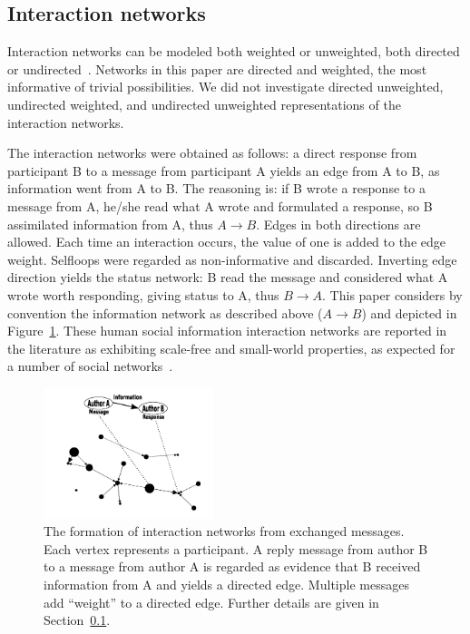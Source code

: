 \documentclass[%
	aip,
	jmp,%
	amsmath,amssymb,
	reprint,%
]{revtex4-1}
\begin{document}
\subsection{Interaction networks}\label{intNet}
Interaction networks can be modeled both weighted or unweighted,
both directed or undirected~\cite{bird,newmanCommunityDirected,newmanCommunity2013}.
Networks in this paper are directed and weighted, the most informative of trivial possibilities.
We did not investigate directed unweighted, undirected weighted,
and undirected unweighted representations of the interaction networks. 

The interaction networks were obtained as follows:
a direct response from participant B to a message from participant A yields an edge from A to B, as information went from A to B.
The reasoning is: if B wrote a response to a message from A,
he/she read what A wrote and formulated a response, so B assimilated information from A, thus $A \rightarrow B$.
Edges in both directions are allowed.
Each time an interaction occurs, the value of one is added to the edge weight.
Selfloops were regarded as non-informative and discarded.
Inverting edge direction yields the status network:
B read the message and considered what A wrote worth responding, giving status to A,
thus $B\rightarrow A$.
This paper considers by convention the information network as described above ($A\rightarrow B$) and depicted in Figure~\ref{formationNetwork}.
These human social information interaction networks are reported in the literature
as exhibiting scale-free and small-world properties,
as expected for a number of social networks~\cite{bird,newmanBook}.

\begin{figure}[!h]
	\centering
	\includegraphics[width=0.44\textwidth]{figs/criaRede2_}
	\caption{The formation of interaction networks from exchanged messages.
	Each vertex represents a participant.
	A reply message from author B to a message from author A is regarded as evidence
	that B received information from A and yields a directed edge.
	Multiple messages add ``weight'' to a directed edge.
	Further details are given in Section~\ref{intNet}.}
	\label{formationNetwork}
\end{figure}
\end{document}
